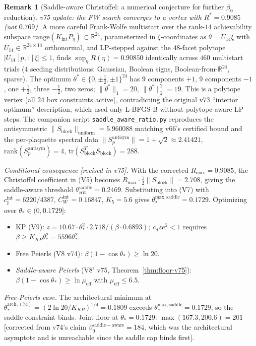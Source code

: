 \documentclass[11pt]{article}
\theoremstyle{definition}
\newtheorem{remark}[theorem]{Remark}
\newcommand{\tr}{\mathrm{tr}}
\newcommand{\R}{\mathbb{R}}
\begin{document}
\begin{remark}[Saddle-aware Christoffel: a numerical conjecture for further $\beta_0$ reduction]
\emph{v75 update: the FW search converges to a vertex with
$R^*=0.9085$ \textup{(}not $0.769$\textup{)}.}  A more careful Frank-Wolfe
multistart over the rank-$14$ achievability subspace
$\mathrm{range}(K_{\mathrm{int}}P_\eta)\subset\R^{24}$, parameterized
in $\xi$-coordinates as
$\theta=U_{14}\xi$ with $U_{14}\in\R^{24\times 14}$ orthonormal, and
LP-stepped against the $48$-facet polytope
$|U_{14}[p,:]\xi|\le 1$, finds $\sup_\eta R(\eta)=0.90850$ identically
across $460$ multistart trials \textup{(}$4$ seeding distributions:
Gaussian, Boolean signs, Boolean-from-$\R^{24}$, sparse\textup{)}.
The optimum $\theta^*\in\{0,\pm\tfrac12,\pm 1\}^{24}$ has $9$ components
$+1$, $9$ components $-1$, one $+\tfrac12$, three $-\tfrac12$, two
zeros; $\|\theta^*\|_1=20$, $\|\theta^*\|_2^2=19$.  This is a polytope
vertex \textup{(}all $24$ box constraints active\textup{)}, contradicting
the original v73 ``interior optimum'' description, which used only
L-BFGS-B without polytope-aware LP steps.  The companion script
\texttt{saddle\_aware\_ratio.py} reproduces the antisymmetric
$\|S_{\mathrm{block}}\|_{\mathrm{uniform}}=5.960088$ matching v66's
certified bound and the per-plaquette spectral data
$\|S_p^{\mathrm{antisym}}\|=1+\sqrt 2\approx 2.41421$,
$\mathrm{rank}(S_p^{\mathrm{antisym}})=4$,
$\tr(S_{\mathrm{block}}^T S_{\mathrm{block}})=288$.

\emph{Conditional consequence \textup{[}revised in v75\textup{]}.}
With the corrected $R_{\max}=0.9085$, the Christoffel coefficient in
(V5) becomes $R_{\max}\cdot\tfrac{1}{2}\|S_{\mathrm{block}}\|=2.708$,
giving the saddle-aware threshold
$\theta_{\mathrm{crit}}^{\mathrm{saddle}}=0.2469$.  Substituting into
(V7) with $c_\sharp^{\mathrm{int}}=6220/4387$,
$C_W^{\mathrm{int}}=0.16847$, $K_5=5.6$ gives
$\theta_*^{\mathrm{max,saddle}}=0.1729$.  Optimizing over $\theta_*\in(0,0.1729]$:
\begin{itemize}[nosep]
\item KP (V9): $z=10.67\cdot\theta_*^2\cdot 2.718/(\beta\cdot 0.6893)$;
$c_d z e^2<1$ requires $\beta\ge K_{KP}\theta_*^2=5596\theta_*^2$.
\item Free Peierls (V8 v74): $\beta(1-\cos\theta_*)\ge\ln 20$.
\item \emph{Saddle-aware Peierls} (V8' v75, Theorem~\ref{thm:floor-v75}):
$\beta(1-\cos\theta_*)\ge\ln\mu_{\mathrm{eff}}$ with $\mu_{\mathrm{eff}}\le 6.5$.
\end{itemize}
\emph{Free-Peierls case.}  The architectural minimum at
$\theta_*^{\mathrm{arch,(74)}}=(2\ln 20/K_{KP})^{1/4}=0.1809$
exceeds $\theta_*^{\mathrm{max,saddle}}=0.1729$, so the saddle
constraint binds.  Joint floor at $\theta_*=0.1729$:
$\max(167.3,200.6)=201$ \textup{[}corrected from v74's claim
$\beta_0^{\mathrm{saddle-aware}}=184$, which was the architectural
asymptote and is unreachable since the saddle cap binds first\textup{]}.


\end{remark}
\end{document}

